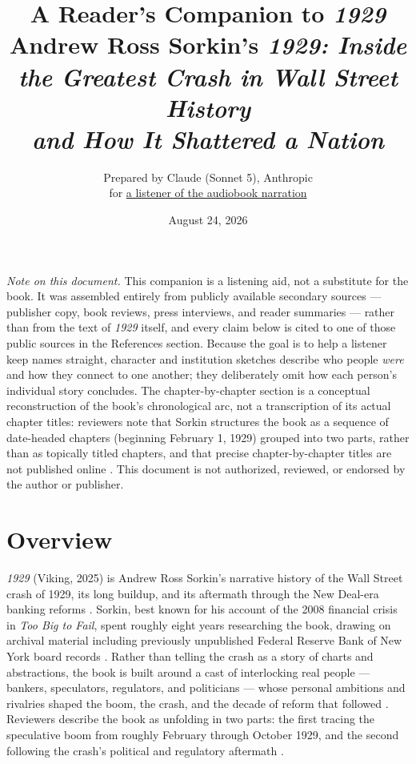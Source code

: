 \documentclass[11pt]{article}
\title{\textbf{A Reader's Companion to \emph{1929}}\\[0.3em]
\large Andrew Ross Sorkin's \emph{1929: Inside the Greatest Crash in Wall Street History \\ and How It Shattered a Nation}}
\author{Prepared by Claude (Sonnet 5), Anthropic \\ \small for \href{mailto:icos.atropa@gmail.com}{a listener of the audiobook narration}}
\date{August 24, 2026}
\begin{document}
\maketitle

\begin{center}
\begin{minipage}{0.85\textwidth}
\small
\textit{Note on this document.} This companion is a listening aid, not a substitute for
the book. It was assembled entirely from publicly available secondary sources ---
publisher copy, book reviews, press interviews, and reader summaries --- rather than
from the text of \emph{1929} itself, and every claim below is cited to one of those
public sources in the References section. Because the goal is to help a listener keep
names straight, character and institution sketches describe who people \emph{were} and
how they connect to one another; they deliberately omit how each person's individual
story concludes. The chapter-by-chapter section is a conceptual reconstruction of the
book's chronological arc, not a transcription of its actual chapter titles: reviewers
note that Sorkin structures the book as a sequence of date-headed chapters (beginning
February 1, 1929) grouped into two parts, rather than as topically titled chapters, and
that precise chapter-by-chapter titles are not published online
\autocite{wikipedia1929book,supersummary1929}. This document is not authorized,
reviewed, or endorsed by the author or publisher.
\end{minipage}
\end{center}

\vspace{1em}

\section*{Overview}

\emph{1929} (Viking, 2025) is Andrew Ross Sorkin's narrative history of the Wall
Street crash of 1929, its long buildup, and its aftermath through the New Deal-era
banking reforms \autocite{sorkin2025book,prh1929,goodreads1929}. Sorkin, best known for his account
of the 2008 financial crisis in \emph{Too Big to Fail}, spent roughly eight years
researching the book, drawing on archival material including previously unpublished
Federal Reserve Bank of New York board records \autocite{axios1929,realclearmarkets1929}.
Rather than telling the crash as a story of charts and abstractions, the book is built
around a cast of interlocking real people --- bankers, speculators, regulators, and
politicians --- whose personal ambitions and rivalries shaped the boom, the crash, and
the decade of reform that followed \autocite{airmail1929,csmonitor1929}. Reviewers
describe the book as unfolding in two parts: the first tracing the speculative boom
from roughly February through October 1929, and the second following the crash's
political and regulatory aftermath \autocite{cato1929,dailyeconomy1929}.
\end{document}
